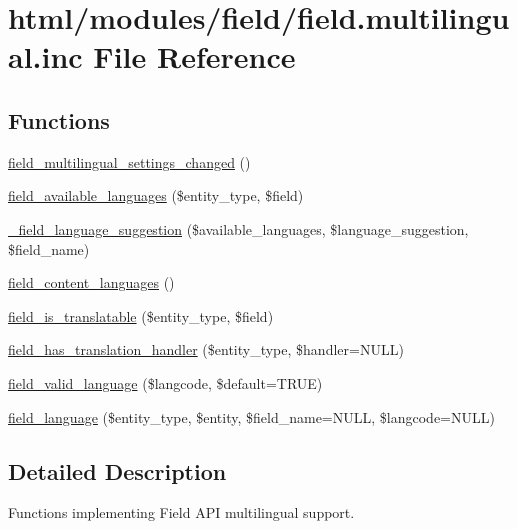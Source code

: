 \hypertarget{field_8multilingual_8inc}{
\section{html/modules/field/field.multilingual.inc File Reference}
\label{field_8multilingual_8inc}
}
\subsection*{Functions}
\begin{DoxyCompactItemize}
\item 
\hyperlink{group__field__language_gafbd7a022815887d2aadf983656571e98}{field\_\-multilingual\_\-settings\_\-changed} ()
\item 
\hyperlink{group__field__language_ga3dbd9611836d9bba15c15f0a8ae83c9b}{field\_\-available\_\-languages} (\$entity\_\-type, \$field)
\item 
\hyperlink{group__field__language_gaf7105831bb68e11809f92c990b50fb6c}{\_\-field\_\-language\_\-suggestion} (\$available\_\-languages, \$language\_\-suggestion, \$field\_\-name)
\item 
\hyperlink{group__field__language_ga78c369e7b76edbb662d8f2e04bc82ad4}{field\_\-content\_\-languages} ()
\item 
\hyperlink{group__field__language_gae2315cbfa6724de32eeea9e06a1811a7}{field\_\-is\_\-translatable} (\$entity\_\-type, \$field)
\item 
\hyperlink{group__field__language_ga56d98c14a956746f91373b68b404a66b}{field\_\-has\_\-translation\_\-handler} (\$entity\_\-type, \$handler=NULL)
\item 
\hyperlink{group__field__language_ga3c8ddbf445782a8ac352279c606aa30c}{field\_\-valid\_\-language} (\$langcode, \$default=TRUE)
\item 
\hyperlink{group__field__language_gaff79088cd3951d2127adad1a2c13ad3e}{field\_\-language} (\$entity\_\-type, \$entity, \$field\_\-name=NULL, \$langcode=NULL)
\end{DoxyCompactItemize}


\subsection{Detailed Description}
Functions implementing Field API multilingual support. 